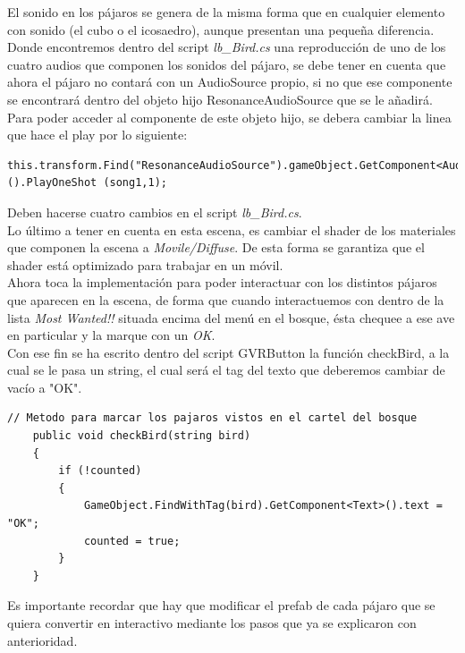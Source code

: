 
\quad El sonido en los pájaros se genera de la misma forma que en cualquier elemento con sonido (el cubo o el icosaedro), aunque presentan una pequeña diferencia. Donde encontremos dentro del script \textit{lb\_Bird.cs} una reproducción de uno de los cuatro audios que componen los sonidos del pájaro, se debe tener en cuenta que ahora el pájaro no contará con un AudioSource propio, si no que ese componente se encontrará dentro del objeto hijo ResonanceAudioSource que se le añadirá.\\

\quad Para poder acceder al componente de este objeto hijo, se debera cambiar la linea que hace el play por lo siguiente:\\

\lstset{language=[sharp]C, breaklines=true, basicstyle=\footnotesize}
\begin{lstlisting}[frame=single, caption={Ejemplo de cambio de audio para pájaro}]
	this.transform.Find("ResonanceAudioSource").gameObject.GetComponent<AudioSource>().PlayOneShot (song1,1);
\end{lstlisting}

\quad Deben hacerse cuatro cambios en el script \textit{lb\_Bird.cs}.\\

\quad Lo último a tener en cuenta en esta escena, es cambiar el shader de los materiales que componen la escena a \textit{Movile/Diffuse}. De esta forma se garantiza que el shader está optimizado para trabajar en un móvil.\\

\quad Ahora toca la implementación para poder interactuar con los distintos pájaros que aparecen en la escena, de forma que cuando interactuemos con dentro de la lista \textit{Most Wanted!!} situada encima del menú en el bosque, ésta chequee a ese ave en particular y la marque con un \textit{OK}.\\

\quad Con ese fin se ha escrito dentro del script GVRButton la función checkBird, a la cual se le pasa un string, el cual será el tag del texto que deberemos cambiar de vacío a "OK".\\

\begin{lstlisting}[frame=single, caption={función checkBird}]
// Metodo para marcar los pajaros vistos en el cartel del bosque
    public void checkBird(string bird)
    {
        if (!counted)
        {
            GameObject.FindWithTag(bird).GetComponent<Text>().text = "OK";
            counted = true;
        }
    }
\end{lstlisting}

\quad Es importante recordar que hay que modificar el prefab de cada pájaro que se quiera convertir en interactivo mediante los pasos que ya se explicaron con anterioridad.\\


\newpage





